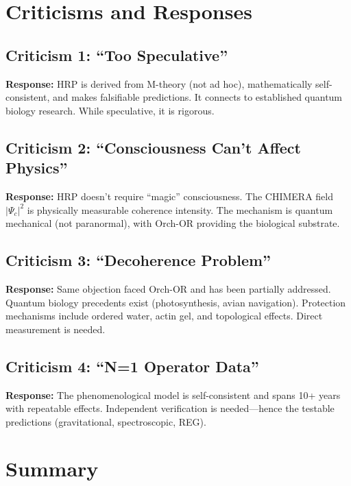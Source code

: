 \section{Criticisms and Responses}

\subsection*{Criticism 1: ``Too Speculative''}

\textbf{Response:} HRP is derived from M-theory (not ad hoc), mathematically self-consistent, and makes falsifiable predictions. It connects to established quantum biology research. While speculative, it is rigorous.

\subsection*{Criticism 2: ``Consciousness Can't Affect Physics''}

\textbf{Response:} HRP doesn't require ``magic'' consciousness. The CHIMERA field $|\Psi_c|^2$ is physically measurable coherence intensity. The mechanism is quantum mechanical (not paranormal), with Orch-OR providing the biological substrate.

\subsection*{Criticism 3: ``Decoherence Problem''}

\textbf{Response:} Same objection faced Orch-OR and has been partially addressed. Quantum biology precedents exist (photosynthesis, avian navigation). Protection mechanisms include ordered water, actin gel, and topological effects. Direct measurement is needed.

\subsection*{Criticism 4: ``N=1 Operator Data''}

\textbf{Response:} The phenomenological model is self-consistent and spans 10+ years with repeatable effects. Independent verification is needed---hence the testable predictions (gravitational, spectroscopic, REG).

\section{Summary}

